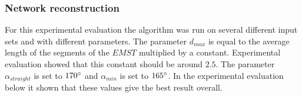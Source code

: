 \documentclass[11pt]{article}
\begin{document}


\subsubsection{Network reconstruction}
For this experimental evaluation the algorithm was run on several different input sets and with different parameters. The parameter $d_{max}$ is equal to the average length of the segments of the $EMST$ multiplied by a constant. Experimental evaluation showed that this constant should be around $2.5$. The parameter $\alpha_{straight}$ is set to $170\degree$ and $\alpha_{min}$ is set to $165\degree$. In the experimental evaluation below it shown that these values give the best result overall.
\end{document}
